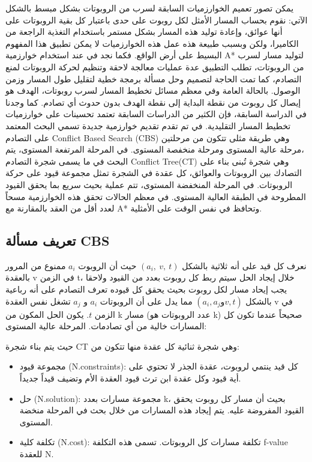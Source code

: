 يمكن تصور تعميم الخوارزميات السابقة لسرب من الروبوتات بشكل مبسط بالشكل الآتي: نقوم بحساب المسار الأمثل لكل روبوت على حدى باعتبار كل بقية الروبوتات على أنها عوائق، وإعادة توليد هذه المسار بشكل مستمر باستخدام التغذية الراجعة من الكاميرا، ولكن وبسبب طبيعة هذه عمل هذه الخوارزميات لا يمكن تطبيق هذا المفهوم البسيط على أرض الواقع. فكما نجد في \cite{d7} عند استخدام خوارزمية A* لتوليد مسار لسرب من الروبوتات، تطلب التطبيق عدة عمليات معالجة لاحقة وتنظيم لحركة الروبوتات لمنع التصادم، كما تمت الحاجة لتصميم وحل مسألة برمجة خطية لتقليل طول المسار وزمن الوصول.
بالحالة العامة وفي معظم مسائل تخطيط المسار لسرب روبوتات، الهدف هو إيصال كل روبوت من نقطة البداية إلى نقطة الهدف بدون حدوث أي تصادم. كما وجدنا في الدراسة السابقة، فإن الكثير من الدراسات السابقة تعتمد تحسينات على خوارزميات تخطيط المسار التقليدية. في \cite{d7} تم تقدم تقديم خوارزمية جديدة تسمي البحث المعتمد على التصادم\textenglish{ Conflict Based Search (CBS)} وهي طريقة مثلى تتكون من مرحلتين ،مرحلة عالية المستوى ومرحلة منخفصة المستوى. في المرحلة المرتفعة المستوى، يتم البحث في ما يسمى شجرة التصادم\textenglish{ Conflict Tree(CT)} وهي شجرة تُبنى بناء على التصادك بين الروبوتات والعوائق، كل عقدة في الشجرة تمثل مجموعة قيود على حركة الروبوتات. في المرحلة المنخفضة المستوى، تتم عملية بحيث سريع بما يحقق القيود المطروحة في الطبقة العالية المستوى. في معظم الحالات تحقق هذه الخوارزمية مسحاً لعدد أقل من العقد بالمقارنة مع A* وتحافظ في نفس الوقت على الأمثلية.


\subsection{تعريف مسألة CBS}

نعرف كل قيد على أنه ثلاثية بالشكل $ (a_i,\ v,\ t) $ حيث أن الروبوت $ a_i $ ممنوع من المرور بالعقدة v في الزمن t، خلال إيجاد الحل سيتم ربط كل روبوت بعدد من القيود ولاحقا يجب إيحاد مسار لكل روبوت بحيث يحقق كل قيوده
تعرف التصادم على أنه رباعية بالشكل $ (a_i,a_jو v,t) $ مما يدل على أن الروبوتات $ a_i $ و  $ a_j $ تشغل نفس العقدة v في الزمن $ t $. يكون الحل المكون من k  مسار (عدد الروبوتات هو k) صحيحاً عندما تكون كل المسارات خالية من أي تصادمات.
المرحلة عالية المستوى:

حيث يتم بناء شجرة CT وهي شجرة ثنائية كل عقدة منها تتكون من:

\begin{itemize}
	
	\item مجموعة قيود (N.constraints): كل قيد ينتمي لروبوت، عقدة الجذر لا تحتوي على أية قيود وكل عقدة ابن ترث قيود العقدة الأم وتضيف قيداً جديداً.
	
	\item حل (N.solution): مجموعة مسارات بعدد k، بحيث أن مسار كل روبوت يحقق القيود المفروضة عليه. يتم إيجاد هذه المسارات من خلال بحث في المرحلة منخضة المستوى.
	
	\item تكلفة كلية (N.cost): تكلفة مسارات كل الروبوتات. تسمى هذه التكلفة f-value   للعقدة N.
	
\end{itemize}

